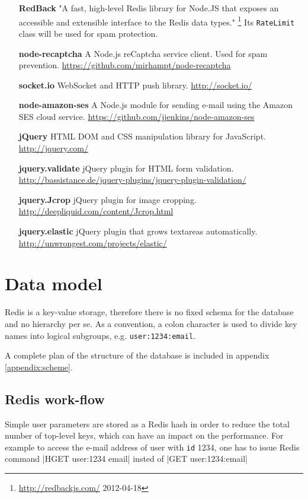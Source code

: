 \documentclass[12pt,oneside]{fithesis}
\begin{document}
\begin{itemize}
			\item[\textbf{RedBack}] "A fast, high-level Redis library for Node.JS that exposes an accessible and extensible interface to the Redis data types." \footnote{\url{http://redbackjs.com/} 2012-04-18} Its \texttt{RateLimit} class will be used for spam protection. 
			\item[\textbf{node-recaptcha}] A Node.js reCaptcha service client. Used for spam prevention. \url{https://github.com/mirhampt/node-recaptcha}
			\item[\textbf{socket.io}] WebSocket and HTTP push library. \url{http://socket.io/}
			\item[\textbf{node-amazon-ses}] A Node.js module for sending e-mail using the Amazon SES cloud service. \url{https://github.com/jjenkins/node-amazon-ses}
			\item[\textbf{jQuery}] HTML DOM and CSS manipulation library for JavaScript. \url{http://jquery.com/}
			\item[\textbf{jquery.validate}] jQuery plugin for HTML form validation. \url{http://bassistance.de/jquery-plugins/jquery-plugin-validation/}
			\item[\textbf{jquery.Jcrop}] jQuery plugin for image cropping. \url{http://deepliquid.com/content/Jcrop.html}
			\item[\textbf{jquery.elastic}] jQuery plugin that grows textareas automatically. \url{http://unwrongest.com/projects/elastic/}
		\end{itemize}
\section{Data model}
	Redis is a key-value storage, therefore there is no fixed schema for the database and no hierarchy per se.  As a convention, a colon character is used to divide key names into logical subgroups, e.g. \texttt{user:1234:email}. 
	
	A complete plan of the structure of the database is included in appendix \ref{appendix:scheme}.
	\subsection{Redis work-flow}
	Simple user parameters are stored as a Redis hash in order to reduce the total number of top-level keys, which can have an impact on the performance. For example to access the e-mail address of user with \texttt{id} 1234, one has to issue Redis command |HGET user:1234 email| insted of |GET user:1234:email|
	
\end{document}
